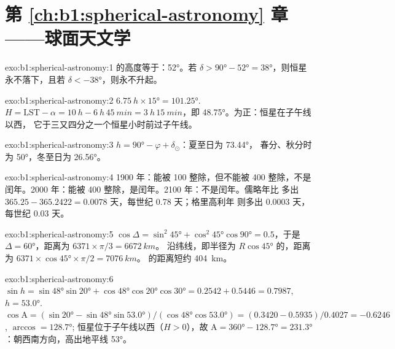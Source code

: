 \section*{第 \ref{ch:b1:spherical-astronomy} 章——球面天文学}

\begin{solution}{exo:b1:spherical-astronomy:1}
的高度等于：\ang{52}。若
$\delta > \ang{90} - \ang{52} = \ang{38}$，则恒星永不落下，且若
$\delta < \ang{-38}$，则永不升起。
\end{solution}

\begin{solution}{exo:b1:spherical-astronomy:2}
$\qty{6.75}{h}\times\ang{15} = \ang{101.25}$. $H = \mathrm{LST} - \alpha =
\qty{10}{h} - \qty{6}{h}\,\qty{45}{min} = \qty{3}{h}\,\qty{15}{min}$，即
\ang{48.75}。为正：恒星在子午线以西，
它于三又四分之一个恒星小时前过子午线。
\end{solution}

\begin{solution}{exo:b1:spherical-astronomy:3}
$h = \ang{90} - \varphi + \delta_\odot$：夏至日为 \ang{73.44}，
春分、秋分时为 \ang{50}，冬至日为 \ang{26.56}。
\end{solution}

\begin{solution}{exo:b1:spherical-astronomy:4}
1900 年：能被 100 整除，但不能被 400 整除，不是闰年。2000 年：能被
400 整除，是闰年。2100 年：不是闰年。儒略年比
多出 $365.25 - 365.2422 = 0.0078$ 天，每世纪 \num{0.78} 天；格里高利年
则多出 $0.0003$ 天，每世纪 \num{0.03} 天。
\end{solution}

\begin{solution}{exo:b1:spherical-astronomy:5}
$\cos\Delta = \sin^2\ang{45} + \cos^2\ang{45}\cos\ang{90} = 0.5$，于是
$\Delta = \ang{60}$，距离为 $6371\times\pi/3 = \qty{6672}{km}$。
沿纬线，即半径为 $R\cos\ang{45}$ 的，距离为
$6371\times\cos\ang{45}\times\pi/2 = \qty{7076}{km}$。
的距离短约 \qty{404}{km}。
\end{solution}

\begin{solution}{exo:b1:spherical-astronomy:6}
$\sin h = \sin\ang{48}\sin\ang{20} + \cos\ang{48}\cos\ang{20}\cos\ang{30}
= 0.2542 + 0.5446 = 0.7987$, $h = \ang{53.0}$.
$\cos\mathrm{A} = (\sin\ang{20} - \sin\ang{48}\sin\ang{53.0})/(\cos\ang{48}
\cos\ang{53.0}) = (0.3420 - 0.5935)/0.4027 = -0.6246$, $\arccos = \ang{128.7}$;
恒星位于子午线以西（$H > 0$），故 $\mathrm{A} = \ang{360} -
\ang{128.7} = \ang{231.3}$：朝西南方向，高出地平线 \ang{53}。
\end{solution}

